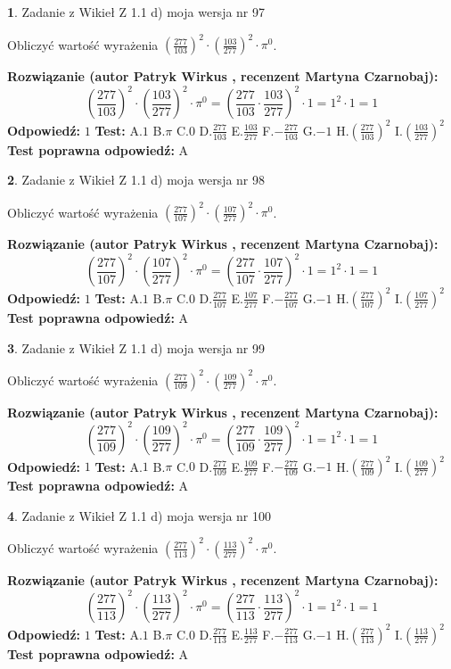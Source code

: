 \documentclass[12pt, a4paper]{article}
\theoremstyle{definition} %
\newtheorem{zad}{}
\newcommand{\zadStart}[1]{\begin{zad}#1\newline}
\newcommand{\zadStop}{\end{zad}}
\newcommand{\rozwStart}[2]{\noindent \textbf{Rozwiązanie (autor #1 , recenzent #2): }\newline}
\newcommand{\rozwStop}{\newline}
\newcommand{\odpStart}{\noindent \textbf{Odpowiedź:}\newline}
\newcommand{\odpStop}{\newline}
\newcommand{\testStart}{\noindent \textbf{Test:}\newline}
\newcommand{\testStop}{\newline}
\newcommand{\kluczStart}{\noindent \textbf{Test poprawna odpowiedź:}\newline}
\newcommand{\kluczStop}{\newline}
\begin{document}
\zadStart{Zadanie z Wikieł Z 1.1 d) moja wersja nr 97}

Obliczyć wartość wyrażenia $(\frac{277}{103})^{2} \cdot (\frac{103}{277})^{2} \cdot \pi^{0}$.
\zadStop
\rozwStart{Patryk Wirkus}{Martyna Czarnobaj}
$$(\frac{277}{103})^{2} \cdot (\frac{103}{277})^{2} \cdot \pi^{0} = (\frac{277}{103} \cdot \frac{103}{277})^{2} \cdot 1 = 1^{2} \cdot 1 = 1$$
\rozwStop
\odpStart
$1$
\odpStop
\testStart
A.$1$ B.$\pi$ C.$0$ D.$\frac{277}{103}$ E.$\frac{103}{277}$
F.$-\frac{277}{103}$ G.$-1$
H.$(\frac{277}{103})^{2}$
I.$(\frac{103}{277})^{2}$
\testStop
\kluczStart
A
\kluczStop



\zadStart{Zadanie z Wikieł Z 1.1 d) moja wersja nr 98}

Obliczyć wartość wyrażenia $(\frac{277}{107})^{2} \cdot (\frac{107}{277})^{2} \cdot \pi^{0}$.
\zadStop
\rozwStart{Patryk Wirkus}{Martyna Czarnobaj}
$$(\frac{277}{107})^{2} \cdot (\frac{107}{277})^{2} \cdot \pi^{0} = (\frac{277}{107} \cdot \frac{107}{277})^{2} \cdot 1 = 1^{2} \cdot 1 = 1$$
\rozwStop
\odpStart
$1$
\odpStop
\testStart
A.$1$ B.$\pi$ C.$0$ D.$\frac{277}{107}$ E.$\frac{107}{277}$
F.$-\frac{277}{107}$ G.$-1$
H.$(\frac{277}{107})^{2}$
I.$(\frac{107}{277})^{2}$
\testStop
\kluczStart
A
\kluczStop



\zadStart{Zadanie z Wikieł Z 1.1 d) moja wersja nr 99}

Obliczyć wartość wyrażenia $(\frac{277}{109})^{2} \cdot (\frac{109}{277})^{2} \cdot \pi^{0}$.
\zadStop
\rozwStart{Patryk Wirkus}{Martyna Czarnobaj}
$$(\frac{277}{109})^{2} \cdot (\frac{109}{277})^{2} \cdot \pi^{0} = (\frac{277}{109} \cdot \frac{109}{277})^{2} \cdot 1 = 1^{2} \cdot 1 = 1$$
\rozwStop
\odpStart
$1$
\odpStop
\testStart
A.$1$ B.$\pi$ C.$0$ D.$\frac{277}{109}$ E.$\frac{109}{277}$
F.$-\frac{277}{109}$ G.$-1$
H.$(\frac{277}{109})^{2}$
I.$(\frac{109}{277})^{2}$
\testStop
\kluczStart
A
\kluczStop



\zadStart{Zadanie z Wikieł Z 1.1 d) moja wersja nr 100}

Obliczyć wartość wyrażenia $(\frac{277}{113})^{2} \cdot (\frac{113}{277})^{2} \cdot \pi^{0}$.
\zadStop
\rozwStart{Patryk Wirkus}{Martyna Czarnobaj}
$$(\frac{277}{113})^{2} \cdot (\frac{113}{277})^{2} \cdot \pi^{0} = (\frac{277}{113} \cdot \frac{113}{277})^{2} \cdot 1 = 1^{2} \cdot 1 = 1$$
\rozwStop
\odpStart
$1$
\odpStop
\testStart
A.$1$ B.$\pi$ C.$0$ D.$\frac{277}{113}$ E.$\frac{113}{277}$
F.$-\frac{277}{113}$ G.$-1$
H.$(\frac{277}{113})^{2}$
I.$(\frac{113}{277})^{2}$
\testStop
\kluczStart
A
\kluczStop
\end{document}
